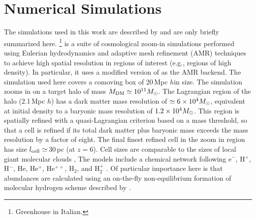 \IfFileExists{emulateapjlegacy.cls}{\documentclass[iop]{emulateapjlegacy}}{\documentclass[iop]{emulateapj}}
\newcommand{\AP}[1]{({\bf \color{apcolor} AP: #1})}
\newcommand{\MM}[1]{({\bf \color{mmcolor} MM: #1})}
\begin{document}
\section{Numerical Simulations}\label{sec:sim}
The simulations used in this work are described by \citealt{Pallottini17a, Pallottini17b} and are only briefly summarized here.
%
\footnote{Greenhouse in Italian.} is a suite of cosmological zoom-in simulations performed using Eulerian hydrodynamics and adaptive mesh refinement (AMR) techniques to achieve high spatial resolution in regions of interest (e.g., regions of high density).
%
In particular, it uses a modified version of 
\citep{Teyssier02a} as the AMR backend. The simulation used here
covers a comoving box of 20\,Mpc $h$\pmOne in size. The simulation
zooms in on a target halo of mass $M_{\rm DM}\simeq10^{11} \mbox{$M_{\odot}$}$. The Lagrangian
region of the halo (2.1\,Mpc $h$\pmOne) has a dark matter
mass resolution of $\simeq 6\times 10^4 \mbox{$M_{\odot}$}$, 
     equivalent at initial density to a baryonic mass resolution of $1.2
     \times 10^4 \mbox{$M_{\odot}$}$.  This 
region is spatially refined with a quasi-Lagrangian criterion based on
a mass threshold, so that a cell is refined if its total dark matter
plus baryonic mass exceeds the mass resolution by a factor of
eight. The final finest refined cell in the zoom in region has size
$l_{\rm cell}\simeq$\,30\,pc (at $z = 6$). 
     Cell sizes are comparable to the sizes of local giant molecular clouds \citep[e.g.,][]{Sanders85a, Federrath13a, Goodman14a},
The models include a chemical network 
following e$^{-}$, H$^+$, H$^-$, He, He$^+$, He$^{++}$, H$_2$, and
H$_2^+$ \citep{Grassi14a,Bovino16a}. Of particular importance here is
that abundances are calculated using an on-the-fly non-equilibrium
formation of molecular hydrogen scheme  
    described by \citet{Pallottini17a}.
\end{document}
